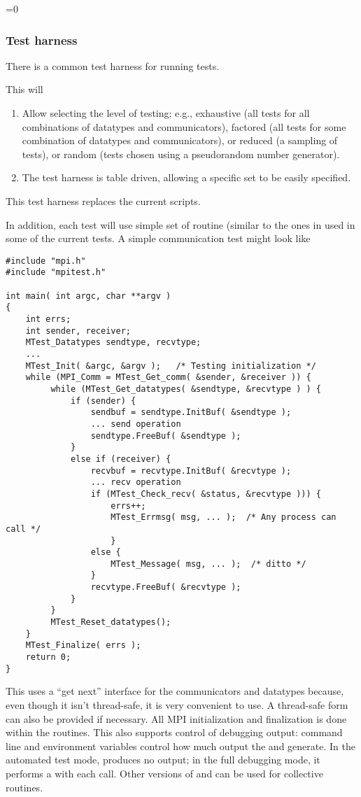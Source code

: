 =0
\subsubsection{Test harness}
There is a common test harness for running tests.  

This will
\begin{enumerate}
\item Allow selecting the level of testing; e.g., exhaustive (all
tests for all combinations of datatypes and communicators), factored
(all tests for some combination of datatypes and communicators), or
reduced (a sampling of tests), or random (tests chosen using a
pseudorandom number generator).  

\item The test harness is table driven, allowing a specific set to be
easily specified.  
\end{enumerate}
This test harness replaces the current  scripts.

In addition, each test will use simple set of routine (similar to the
ones in  used in some of the current tests.  A simple
communication test might look like
\begin{verbatim}
#include "mpi.h"
#include "mpitest.h"

int main( int argc, char **argv )
{
    int errs;
    int sender, receiver;
    MTest_Datatypes sendtype, recvtype;
    ...
    MTest_Init( &argc, &argv );   /* Testing initialization */
    while (MPI_Comm = MTest_Get_comm( &sender, &receiver )) {
         while (MTest_Get_datatypes( &sendtype, &recvtype ) ) {
             if (sender) {
                 sendbuf = sendtype.InitBuf( &sendtype );
                 ... send operation
                 sendtype.FreeBuf( &sendtype );
             } 
             else if (receiver) {
                 recvbuf = recvtype.InitBuf( &recvtype );
                 ... recv operation
                 if (MTest_Check_recv( &status, &recvtype ))) {
                     errs++;
                     MTest_Errmsg( msg, ... );  /* Any process can call */
                     }
                 else {
                     MTest_Message( msg, ... );  /* ditto */
                 }
                 recvtype.FreeBuf( &recvtype );
             }
         }
         MTest_Reset_datatypes();
    }
    MTest_Finalize( errs );
    return 0;
}
\end{verbatim}
This uses a ``get next'' interface for the communicators and datatypes
because, even though it isn't thread-safe, it is very convenient to
use.  A thread-safe form can also be provided if necessary.  All MPI
initialization and finalization is done within the 
routines.  This also supports control of debugging output: command
line and environment variables control how much output the
 and  generate.  In the
automated test mode,  produces no output; in the
full debugging mode, it performs a  with each
call.  Other versions of  and
 can be used for collective routines.

\fi
